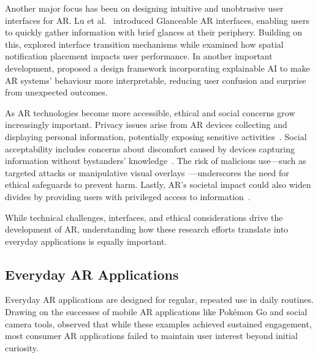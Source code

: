 Another major focus has been on designing intuitive and unobtrusive user interfaces for AR. Lu et al.~\cite{lu2020glanceable, lu2021evaluating} introduced Glanceable AR interfaces, enabling users to quickly gather information with brief glances at their periphery. Building on this, \citet{lu2022exploring} explored interface transition mechanisms while \citet{plabst2022push} examined how spatial notification placement impacts user performance. In another important development, \citet{xu2023xair} proposed a design framework incorporating explainable AI to make AR systems’ behaviour more interpretable, reducing user confusion and surprise from unexpected outcomes.

As AR technologies become more accessible, ethical and social concerns grow increasingly important. Privacy issues arise from AR devices collecting and displaying personal information, potentially exposing sensitive activities~\cite{regenbrecht2024see, wolf2018we}. Social acceptability includes concerns about discomfort caused by devices capturing information without bystanders’ knowledge~\cite{denning2014situ, o2023privacy}. The risk of malicious use—such as targeted attacks or manipulative visual overlays~\cite{eghtebas2021advantage, eghtebas2023co}—underscores the need for ethical safeguards to prevent harm. Lastly, AR’s societal impact could also widen divides by providing users with privileged access to information~\cite{regenbrecht2024see}.

While technical challenges, interfaces, and ethical considerations drive the development of AR, understanding how these research efforts translate into everyday applications is equally important.

\subsection{Everyday AR Applications}

Everyday AR applications are designed for regular, repeated use in daily routines. Drawing on the successes of mobile AR applications like Pokémon Go and social camera tools, \citet{azuma2019road} observed that while these examples achieved sustained engagement, most consumer AR applications failed to maintain user interest beyond initial curiosity.

